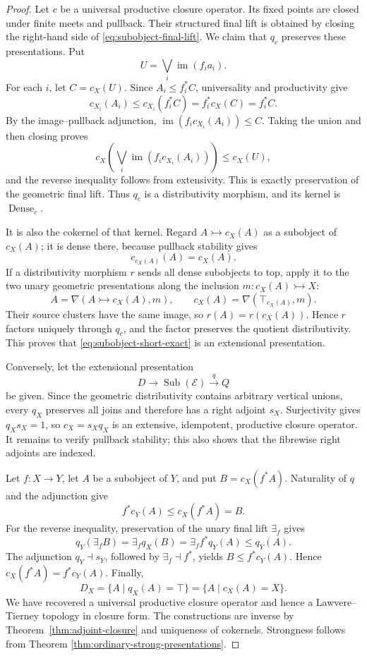 \documentclass[12pt,oneside,reqno]{amsart}
\theoremstyle{definition}
\theoremstyle{remark}
\begin{document}
\begin{proof}
Let \(c\) be a universal productive closure operator.  Its fixed
points are closed under finite meets and pullback.  Their structured
final lift is obtained by closing the right-hand side of
\eqref{eq:subobject-final-lift}.  We claim that \(q_c\) preserves these
presentations.  Put
\[
                  U=\bigvee_i\operatorname{im}(f_i a_i).
\]
For each \(i\), let \(C=c_X(U)\).  Since
\(A_i\leqslant f_i^*C\), universality and productivity give
\[
 c_{X_i}(A_i)\leqslant c_{X_i}(f_i^*C)
   =f_i^*c_X(C)=f_i^*C.
\]
By the image--pullback adjunction,
\(\operatorname{im}(f_i c_{X_i}(A_i))\leqslant C\).  Taking the union
and then closing proves
\[
 c_X\!\left(\bigvee_i\operatorname{im}(f_i c_{X_i}(A_i))\right)
 \leqslant c_X(U),
\]
and the reverse inequality follows from extensivity.  This is exactly
preservation of the geometric final lift.  Thus \(q_c\) is a
distributivity morphism, and its kernel is
\(\operatorname{Dense}_c\).

It is also the cokernel of that kernel.  Regard
\(A\rightarrowtail c_X(A)\) as a subobject of \(c_X(A)\); it is dense
there, because pullback stability gives
\[
 c_{c_X(A)}(A)=c_X(A).
\]
If a distributivity morphism \(r\) sends all dense subobjects to top,
apply it to the two unary geometric presentations along the inclusion
\(m:c_X(A)\rightarrowtail X\):
\[
 A=\nabla(A\rightarrowtail c_X(A),m),
 \qquad
 c_X(A)=\nabla(\top_{c_X(A)},m).
\]
Their source clusters have the same image, so
\(r(A)=r(c_X(A))\).  Hence \(r\) factors uniquely through \(q_c\), and
the factor preserves the quotient distributivity.  This proves that
\eqref{eq:subobject-short-exact} is an extensional presentation.

Conversely, let the extensional presentation
\[
 D\longrightarrow\operatorname{Sub}(\mathscr E)
 \xrightarrow{q}Q
\]
be given.  Since the geometric distributivity contains arbitrary
vertical unions, every \(q_X\) preserves all joins and therefore has a
right adjoint \(s_X\).  Surjectivity gives \(q_Xs_X=1\), so
\(c_X=s_Xq_X\) is an extensive, idempotent, productive closure
operator.  It remains to verify pullback stability; this also shows that
the fibrewise right adjoints are indexed.

Let \(f:X\to Y\), let \(A\) be a subobject of \(Y\), and put
\(B=c_X(f^*A)\).  Naturality of \(q\) and the adjunction give
\[
                         f^*c_Y(A)\leqslant c_X(f^*A)=B.
\]
For the reverse inequality, preservation of the unary final lift
\(\exists_f\) gives
\[
 q_Y(\exists_fB)=\exists_fq_X(B)
   =\exists_f f^*q_Y(A)\leqslant q_Y(A).
\]
The adjunction \(q_Y\dashv s_Y\), followed by
\(\exists_f\dashv f^*\), yields
\(B\leqslant f^*c_Y(A)\).  Hence
\(c_X(f^*A)=f^*c_Y(A)\).  Finally,
\[
 D_X=\{A\mid q_X(A)=\top\}
    =\{A\mid c_X(A)=X\}.
\]
We have recovered a universal productive closure operator and hence a
Lawvere--Tierney topology in closure form.  The constructions are
inverse by Theorem~\ref{thm:adjoint-closure} and uniqueness of
cokernels.  Strongness follows from Theorem
\ref{thm:ordinary-strong-presentations}.
\end{proof}
\end{document}
